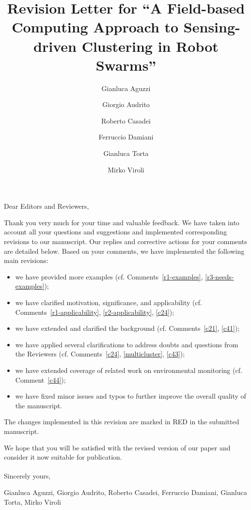 \documentclass{article}
\newcounter{reviewer}
\newcounter{comment}[reviewer]
\begin{document}
\title{{\Large Revision Letter for} ``A Field-based Computing Approach to Sensing-driven Clustering in Robot Swarms''}
\author{
Gianluca Aguzzi
\and
Giorgio Audrito
\and
Roberto Casadei
\and
Ferruccio Damiani
\and
Gianluca Torta
\and
Mirko Viroli
}

\maketitle

Dear Editors and Reviewers, \newline

Thank you very much for your time and valuable feedback.
%
We have taken into account all your questions and suggestions and implemented corresponding revisions to our manuscript.
%
Our replies and corrective actions for your comments are detailed below.
%
Based on your comments, we have implemented the following main revisions:
%
\begin{itemize}
\item we have provided more examples (cf. Comments~\ref{r1-examples}, \ref{r3-needs-examples});
\item we have clarified motivation, significance, and applicability (cf. Comments~\ref{r1-applicability}, \ref{r2-applicability}, \ref{c24});
\item we have extended and clarified the background (cf. Comments~\ref{c21}, \ref{c41});
\item we have applied several clarifications to address doubts and questions from the Reviewers (cf. Comments~\ref{c24}, \ref{multicluster}, \ref{c43});
\item we have extended coverage of related work on environmental monitoring (cf. Comment~\ref{c44});
\item we have fixed minor issues and typos to further improve the overall quality of the manuscript.
\end{itemize}
%
The changes implemented in this revision are {\color{red}marked in RED} in the submitted manuscript.

We hope that you will be satisfied with the revised version of our paper and consider it now suitable for publication.
\\ ~ \\

\noindent Sincerely yours,

Gianluca Aguzzi, Giorgio Audrito, Roberto Casadei, Ferruccio Damiani, Gianluca Torta, Mirko Viroli


\raggedbottom
\end{document}
